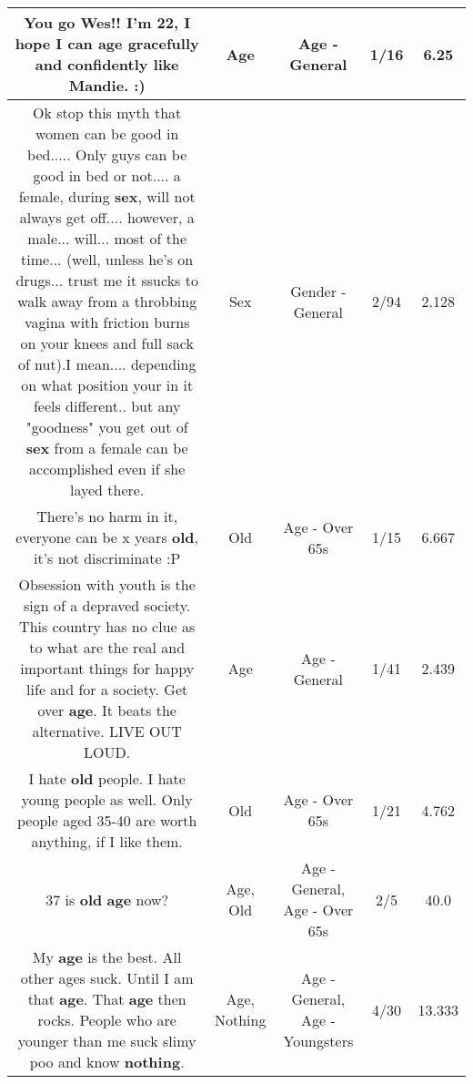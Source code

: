 \documentclass[11pt]{article}
\newlength\mylength
\begin{document}
\begin{center}
\begin{longtable}{|C{.65\mylength}|C{.30\mylength}|C{.12\mylength}|C{.12\mylength}|C{.12\mylength}|}
  \small You go Wes!! I'm 22, I hope I can \textbf{age} gracefully and confidently like Mandie. :)\normalsize   & Age & Age - General & 1/16 & 6.25 \\  \hline
  \small Ok stop this myth that women can be good in bed..... Only guys can be good in bed or not.... a female, during \textbf{sex}, will not always get off.... however, a male... will... most of the time... (well, unless he's on drugs... trust me it ssucks to walk away from a throbbing vagina with friction burns on your knees and full sack of nut).I mean.... depending on what position your in it feels different.. but any "goodness" you get out of \textbf{sex} from a female can be accomplished even if she layed there.\normalsize   & Sex & Gender - General & 2/94 & 2.128 \\  \hline
  \small There's no harm in it, everyone can be x years \textbf{old}, it's not discriminate :P\normalsize   & Old & Age - Over 65s & 1/15 & 6.667 \\  \hline
  \small Obsession with youth is the sign of a depraved society. This country has no clue as to what are the real and important things for happy life and for a society. Get over \textbf{age}. It beats the alternative. LIVE OUT LOUD.\normalsize   & Age & Age - General & 1/41 & 2.439 \\  \hline
  \small I hate \textbf{old} people. I hate young people as well. Only people aged 35-40 are worth anything, if I like them.\normalsize   & Old & Age - Over 65s & 1/21 & 4.762 \\  \hline
  \small 37 is \textbf{old} \textbf{age} now?\normalsize   & Age, Old & Age - General, Age - Over 65s & 2/5 & 40.0 \\  \hline
  \small My \textbf{age} is the best. All other ages suck. Until I am that \textbf{age}. That \textbf{age} then rocks. People who are younger than me suck slimy poo and know \textbf{nothing}.\normalsize   & Age, Nothing & Age - General, Age - Youngsters & 4/30 & 13.333 \\  \hline

\end{longtable}
\end{center}
\end{document}
